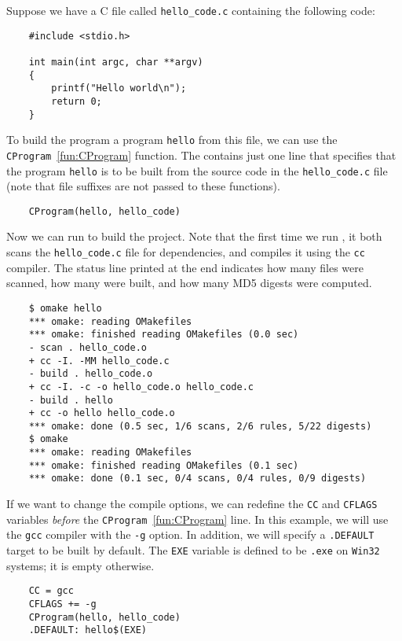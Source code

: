 Suppose we have a C file called \verb+hello_code.c+ containing the following code:

\begin{verbatim}
    #include <stdio.h>

    int main(int argc, char **argv)
    {
        printf("Hello world\n");
        return 0;
    }
\end{verbatim}

To build the program a program \verb+hello+ from this file, we can use the \verb+CProgram+~\ref{fun:CProgram} function.
The  contains just one line that specifies that the program \verb+hello+ is
to be built from the source code in the \verb+hello_code.c+ file (note that file suffixes
are not passed to these functions).

\begin{verbatim}
    CProgram(hello, hello_code)
\end{verbatim}

Now we can run  to build the project.  Note that the first time we run ,
it both scans the \verb+hello_code.c+ file for dependencies, and compiles it using the \verb+cc+
compiler.  The status line printed at the end indicates how many files were scanned, how many
were built, and how many MD5 digests were computed.

\begin{verbatim}
    $ omake hello
    *** omake: reading OMakefiles
    *** omake: finished reading OMakefiles (0.0 sec)
    - scan . hello_code.o
    + cc -I. -MM hello_code.c
    - build . hello_code.o
    + cc -I. -c -o hello_code.o hello_code.c
    - build . hello
    + cc -o hello hello_code.o
    *** omake: done (0.5 sec, 1/6 scans, 2/6 rules, 5/22 digests)
    $ omake
    *** omake: reading OMakefiles
    *** omake: finished reading OMakefiles (0.1 sec)
    *** omake: done (0.1 sec, 0/4 scans, 0/4 rules, 0/9 digests)
\end{verbatim}

If we want to change the compile options, we can redefine the \verb+CC+ and \verb+CFLAGS+
variables \emph{before} the \verb+CProgram+~\ref{fun:CProgram} line.  In this example, we will use the \verb+gcc+
compiler with the \verb+-g+ option.  In addition, we will specify a \verb+.DEFAULT+ target
to be built by default.  The \verb+EXE+ variable is defined to be \verb+.exe+ on \verb+Win32+
systems; it is empty otherwise.

\begin{verbatim}
    CC = gcc
    CFLAGS += -g
    CProgram(hello, hello_code)
    .DEFAULT: hello$(EXE)
\end{verbatim}

